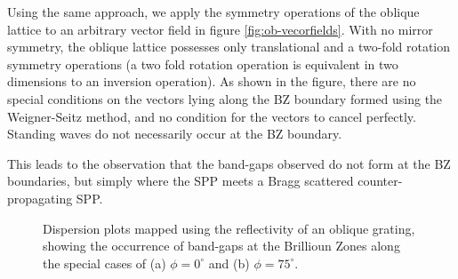 Using the same approach, we apply the symmetry operations of the oblique lattice to an arbitrary vector field in figure \ref{fig:ob-vecorfields}. With no mirror symmetry, the oblique lattice possesses only translational and a two-fold rotation symmetry operations (a two fold rotation operation is equivalent in two dimensions to an inversion operation). As shown in the figure, there are no special conditions on the vectors lying along the BZ boundary formed using the Weigner-Seitz method, and no condition for the vectors to cancel perfectly. Standing waves do not necessarily occur at the BZ boundary. 

This leads to the observation that the band-gaps observed do not form at the BZ boundaries, but simply where the SPP meets a Bragg scattered counter-propagating SPP.
\begin{figure}
\begin{center}
\end{center}
\caption[Dispersion plots mapped using the reflectivity of an oblique grating.]{Dispersion plots mapped using the reflectivity of an oblique grating, showing the occurrence of band-gaps at the Brillioun Zones along the special cases of (a) $\phi=0^\circ$ and (b) $\phi=75^\circ$.\label{fig:obl-dispersionaroundhighsym}}
\end{figure}
